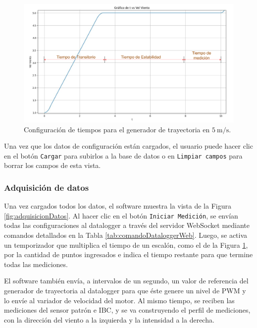 \begin{figure}[H]
    \centering
    \includegraphics[width=0.9\linewidth]{Figuras/AplicacionWeb/frondend/curvaEscalon.png}
    \caption{Configuración de tiempos para el generador de trayectoria en $\SI{5}{\meter\per\second}$.}
    \label{fig:curvaEscalon}
\end{figure}

Una vez que los datos de configuración están cargados, el usuario puede hacer clic en el botón \texttt{Cargar} para subirlos a la base de datos o en \texttt{Limpiar campos} para borrar los campos de esta vista.


\subsubsection{Adquisición de datos}\label{sec:adquisicionDatos}

Una vez cargados todos los datos, el software muestra la vista de la Figura \ref{fig:adquisicionDatos}. Al hacer clic en el botón \texttt{Iniciar Medición}, se envían todas las configuraciones al datalogger a través del servidor WebSocket mediante comandos detallados en la Tabla \ref{tab:comandoDataloggerWeb}. Luego, se activa un temporizador que multiplica el tiempo de un escalón, como el de la Figura \ref{fig:curvaEscalon}, por la cantidad de puntos ingresados e indica el tiempo restante para que termine todas las mediciones. 

El software también envía, a intervalos de un segundo, un valor de referencia del generador de trayectoria al datalogger para que éste genere un nivel de PWM y lo envíe al variador de velocidad del motor. Al mismo tiempo, se reciben las mediciones del sensor patrón e IBC, y se va construyendo el perfil de mediciones, con la dirección del viento a la izquierda y la intensidad a la derecha.

